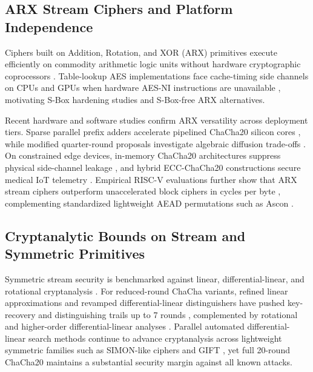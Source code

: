 \documentclass[conference]{IEEEtran}
\begin{document}
\subsection{ARX Stream Ciphers and Platform Independence}
Ciphers built on Addition, Rotation, and XOR (ARX) primitives execute efficiently on commodity arithmetic logic units without hardware cryptographic coprocessors \cite{bernstein2008chacha, rfc8439}. Table-lookup AES implementations face cache-timing side channels on CPUs and GPUs when hardware AES-NI instructions are unavailable \cite{ahn2021trident}, motivating S-Box hardening studies \cite{topanto2022security} and S-Box-free ARX alternatives.

Recent hardware and software studies confirm ARX versatility across deployment tiers. Sparse parallel prefix adders accelerate pipelined ChaCha20 silicon cores \cite{rashidi2025highperformance}, while modified quarter-round proposals investigate algebraic diffusion trade-offs \cite{kebande2023extendedchacha}. On constrained edge devices, in-memory ChaCha20 architectures suppress physical side-channel leakage \cite{aamir2021chacha20}, and hybrid ECC-ChaCha20 constructions secure medical IoT telemetry \cite{sethi2025lightweight}. Empirical RISC-V evaluations further show that ARX stream ciphers outperform unaccelerated block ciphers in cycles per byte \cite{nianc2022symmetric}, complementing standardized lightweight AEAD permutations such as Ascon \cite{dobraunig2021ascon}.

\subsection{Cryptanalytic Bounds on Stream and Symmetric Primitives}
Symmetric stream security is benchmarked against linear, differential-linear, and rotational cryptanalysis \cite{canteaut2025linear, biryukov2025linear, todo2024differentiallinear}. For reduced-round ChaCha variants, refined linear approximations and revamped differential-linear distinguishers have pushed key-recovery and distinguishing trails up to 7 rounds \cite{coutinho2021improved, dey2022revamped, beierle2022improved}, complemented by rotational and higher-order differential-linear analyses \cite{barbero2022rotational, ghafoori2024higherorder}. Parallel automated differential-linear search methods continue to advance cryptanalysis across lightweight symmetric families such as SIMON-like ciphers and GIFT \cite{lv2026automated, wang2024differentiallinear}, yet full 20-round ChaCha20 maintains a substantial security margin against all known attacks.
\end{document}
